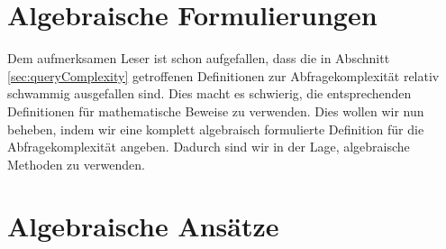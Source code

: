\documentclass[a4paper]{scrreprt}
\theoremstyle{definition}
\begin{document}
\section{Algebraische Formulierungen}
Dem aufmerksamen Leser ist schon aufgefallen, dass die in 
Abschnitt \ref{sec:queryComplexity} getroffenen Definitionen
zur Abfragekomplexität relativ schwammig ausgefallen sind.
Dies macht es schwierig, die entsprechenden Definitionen
für mathematische Beweise zu verwenden.
Dies wollen wir nun beheben, indem wir eine komplett algebraisch
formulierte Definition für die Abfragekomplexität angeben.
Dadurch sind wir in der Lage, algebraische Methoden zu verwenden.


\section{Algebraische Ansätze}


\printbibliography
\end{document}
